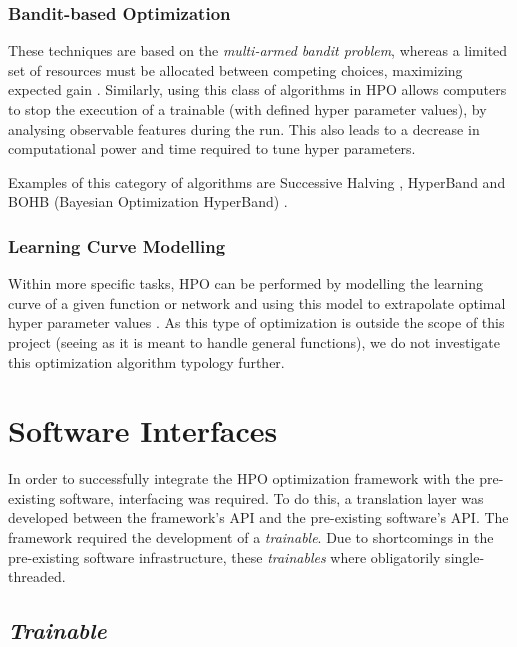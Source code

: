 \documentclass[runningheads]{llncs}
\begin{document}
\subsubsection{Bandit-based Optimization}

These techniques are based on the \textit{multi-armed bandit problem}, whereas a limited set of resources must be allocated between competing choices, maximizing expected gain \cite{Katehakis1987TheMB}. Similarly, using this class of algorithms in HPO allows computers to stop the execution of a trainable (with defined hyper parameter values), by analysing observable features during the run. This also leads to a decrease in computational power and time required to tune hyper parameters.

Examples of this category of algorithms are Successive Halving \cite{jamieson2015nonstochastic}, HyperBand \cite{li2016hyperband} and BOHB (Bayesian Optimization HyperBand) \cite{pmlr-v80-falkner18a}.

\subsubsection{Learning Curve Modelling}

Within more specific tasks, HPO can be performed by modelling the learning curve of a given function or network and using this model to extrapolate optimal hyper parameter values \cite{10555}. As this type of optimization is outside the scope of this project (seeing as it is meant to handle general functions), we do not investigate this optimization algorithm typology further.

\section{Software Interfaces}

In order to successfully integrate the HPO optimization framework with the pre-existing software, interfacing was required. To do this, a translation layer was developed between the framework's API and the pre-existing software's API. The framework required the development of a \textit{trainable}. Due to shortcomings in the pre-existing software infrastructure, these \textit{trainables} where obligatorily single-threaded.

\subsection{\textit{Trainable}}
\end{document}
